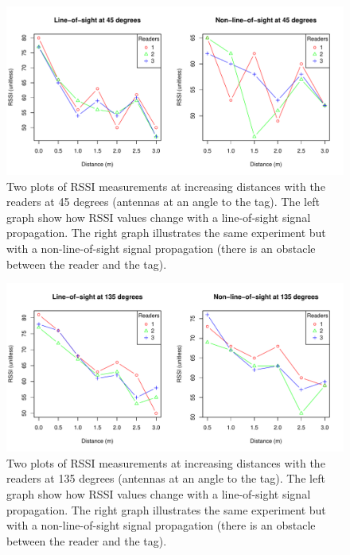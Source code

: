 \begin{figure}[H]
	\begin{center}
		\includegraphics[width=1\textwidth]{figures/rssi_distance_3m_45deg}
		\caption{Two plots of RSSI measurements at increasing distances with the readers at 45 degrees (antennas at an angle to the tag). The left graph show how RSSI values change with a line-of-sight signal propagation. The right graph illustrates the same experiment but with a non-line-of-sight signal propagation (there is an obstacle between the reader and the tag).}
	\end{center}
\end{figure}

\begin{figure}[H]
	\begin{center}
		\includegraphics[width=1\textwidth]{figures/rssi_distance_3m_135deg}
		\caption{Two plots of RSSI measurements at increasing distances with the readers at 135 degrees (antennas at an angle to the tag). The left graph show how RSSI values change with a line-of-sight signal propagation. The right graph illustrates the same experiment but with a non-line-of-sight signal propagation (there is an obstacle between the reader and the tag).}
	\end{center}
\end{figure}


